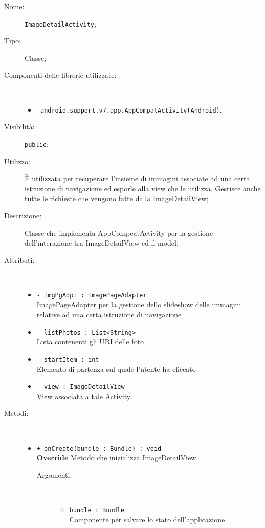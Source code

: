 \documentclass[../DefinizioneDiProdotto.tex]{subfiles}
\begin{document}
    \begin{description}
\item[Nome:] \texttt{ImageDetailActivity};
\item[Tipo:] Classe;
\item[Componenti delle librerie utilizzate:] \
\begin{itemize}
\item \texttt{ android.support.v7.app.AppCompatActivity(Android)}.

\end{itemize}
\item[Visibilità:] \texttt{public};
\item[Utilizzo:] È utilizzata per recuperare l'insieme di immagini associate ad una certa istruzione di navigazione ed esporle alla view che le utilizza. Gestisce anche tutte le richieste che vengono fatte dalla ImageDetailView;
\item[Descrizione:] Classe che implementa AppCompcatActivity per la gestione dell'interazione tra ImageDetailView ed il model;
\item[Attributi:] \
\begin{itemize}
\item \texttt{- imgPgAdpt : ImagePageAdapter}\\
ImagePageAdapter per la gestione dello slideshow delle immagini relative ad una certa istruzione di navigazione

\item \texttt{- listPhotos : List<String>}\\
Lista contenenti gli URI delle foto

\item \texttt{- startItem : int}\\
Elemento di partenza sul quale l'utente ha cliccato

\item \texttt{- view : ImageDetailView}\\
View associata a tale Activity

\end{itemize}
\item[Metodi:] \
\begin{itemize}
\item \texttt{+ onCreate(bundle : Bundle) : void}\\
\textbf{Override} Metodo che inizializza ImageDetailView
 \begin{description}
\item[Argomenti:] \
\begin{itemize}
\item \texttt{bundle : Bundle}\\
Componente per salvare lo stato dell'applicazione\end{itemize}
\end{description}
\end{itemize}
\end{description}
\end{document}
